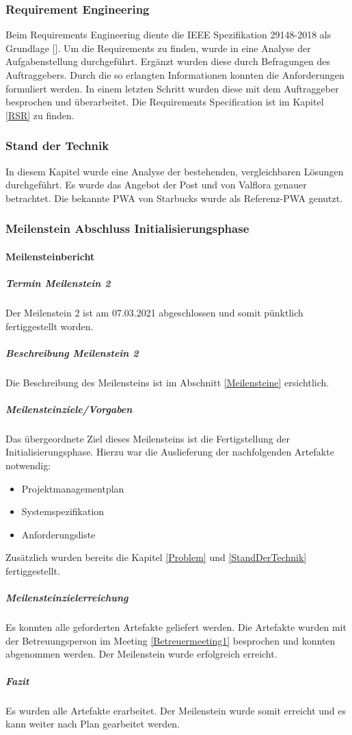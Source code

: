 \subsubsection{Requirement Engineering}
Beim Requirements Engineering diente die IEEE Spezifikation 29148-2018 als Grundlage [\cite{ieeeSrs}]. Um die Requirements zu finden, wurde in eine Analyse der Aufgabenstellung durchgeführt. Ergänzt wurden diese durch Befragungen des Auftraggebers. Durch die so erlangten Informationen konnten die Anforderungen formuliert werden. In einem letzten Schritt wurden diese mit dem Auftraggeber besprochen und überarbeitet. Die Requirements Specification ist im Kapitel \ref{RSR} zu finden. 
\subsubsection{Stand der Technik}
In diesem Kapitel wurde eine Analyse der bestehenden, vergleichbaren Lösungen durchgeführt. Es wurde das Angebot der Post und von Valflora genauer betrachtet. Die bekannte \gls{PWA} von Starbucks wurde als Referenz-\gls{PWA} genutzt. 
\newpage
\subsubsection{Meilenstein Abschluss Initialisierungsphase}
\paragraph{Meilensteinbericht}
\subparagraph{Termin Meilenstein 2}
Der Meilenstein 2 ist am 07.03.2021 abgeschlossen und somit pünktlich fertiggestellt worden.
\subparagraph{Beschreibung Meilenstein 2}
Die Beschreibung des Meilensteins ist im Abschnitt \ref{Meilensteine} ersichtlich. 
\subparagraph{Meilensteinziele/Vorgaben}
Das übergeordnete Ziel dieses Meilensteins ist die Fertigstellung der Initialisierungsphase.
Hierzu war die Auslieferung der nachfolgenden Artefakte notwendig:
\begin{itemize}
	\item Projektmanagementplan
	\item Systemspezifikation
	\item Anforderungsliste
\end{itemize}
Zusätzlich wurden bereits die Kapitel \ref{Problem} und \ref{StandDerTechnik} fertiggestellt. 
\subparagraph{Meilensteinzielerreichung}
Es konnten alle geforderten Artefakte geliefert werden. Die Artefakte wurden mit der Betreuungsperson im Meeting \ref{Betreuermeeting1} besprochen und konnten abgenommen werden. 
Der Meilenstein wurde erfolgreich erreicht. 
\subparagraph{Fazit}
Es wurden alle Artefakte erarbeitet. Der Meilenstein wurde somit erreicht und es kann weiter nach Plan gearbeitet werden.

